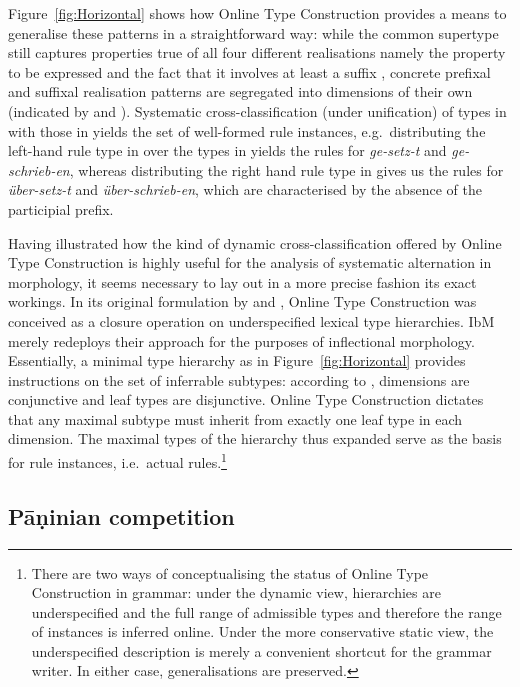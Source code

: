 \documentclass[output=paper,biblatex,babelshorthands,newtxmath,draftmode,colorlinks,citecolor=brown]{langscibook}
\begin{document}
\begin{exe}
\begin{xlist}
\begin{exe}
\begin{xlist}
Figure~\ref{fig:Horizontal} shows how Online Type Construction provides
a means to generalise these patterns in a straightforward way: while the
common supertype still captures properties true of all four different
realisations \emdash namely the property to be expressed and the fact that it
involves at least a suffix \emdash, concrete prefixal and suffixal realisation
patterns are segregated into dimensions of their own (indicated by
 and ). Systematic cross-classification
(under unification) of types in  with those in
 yields the set of well-formed rule instances,
e.g.\ distributing the left-hand rule type in  over the
types in  yields the rules for \textit{ge-setz-t} and
\textit{ge-schrieb-en}, whereas distributing the right hand rule type
in  gives us the rules for \textit{über-setz-t} and
\textit{über-schrieb-en}, which are characterised by the absence of
the participial prefix.

Having illustrated how the kind of dynamic cross-classification
offered by Online Type Construction is highly useful for the analysis
of systematic alternation in morphology, it seems necessary to lay out
in a more precise fashion its exact workings. In its original
formulation by \citet{Koenig94} and \citet{Koenig99}, Online Type
Construction was conceived as a closure operation on underspecified
lexical type hierarchies. IbM merely redeploys their approach for the
purposes of inflectional morphology. Essentially, a minimal type
hierarchy as in Figure~\ref{fig:Horizontal} provides instructions on
the set of inferrable subtypes: according to \citet{Koenig94},
dimensions are conjunctive and leaf types are disjunctive. Online Type
Construction dictates that any maximal subtype must inherit from
exactly one leaf type in each dimension. The maximal types of the
hierarchy thus expanded serve as the basis for rule instances, i.e.\
actual rules.\footnote{\label{fn:OTC}There are two ways of
  conceptualising the status of Online Type Construction in grammar:
  under the dynamic view, hierarchies are underspecified and the full
  range of admissible types and therefore the range of instances is
  inferred online. Under the more conservative static view, the
  underspecified description is merely a convenient shortcut for the
  grammar writer. In either case, generalisations are preserved.  }



\subsection{Pāṇinian competition}
\label{sec:Panini}


\end{xlist}
\end{exe}
\end{xlist}
\end{exe}
\end{document}
